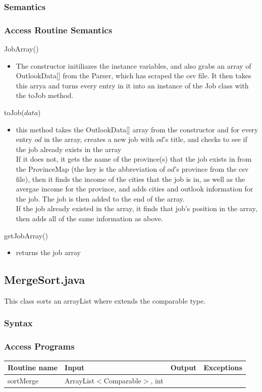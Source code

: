 \documentclass[12pt,fleqn]{article}
\begin{document}
\subsubsection*{Semantics}
\subsubsection*{Access Routine Semantics}
\noindent JobArray()
\begin{itemize}
\item The constructor initiliazes the instance variables, and also grabs an array of OutlookData[] from the Parser, which has scraped the csv file. It then takes this arrya and turns every entry in it into an instance of the Job class with the toJob method.
\end{itemize}
\noindent toJob($data$)
\begin{itemize}
\item this method takes the OutlookData[] array from the constructor and for every entry $od$ in the array, creates a new job with $od$'s title, and checks to see if the job already exists in the array
\\If it does not, it gets the name of the province(s) that the job exists in from the ProvinceMap (the key is the abbreviation of $od$'s province from the csv file), then it finds the income of the cities that the job is in, as well as the avergae income for the province, and adds cities and outlook information for the job. The job is then added to the end of the array.
\\If the job already existed in the array, it finds that job's position in the array, then adds all of the same information as above.
\end{itemize}
\noindent getJobArray()
\begin{itemize}
\item returns the job array
\end{itemize}


\subsection*{MergeSort.java}\label{sort}
This class sorts an arrayList where extends the comparable type.
\subsubsection* {Syntax}

\subsubsection* {Access Programs}
\begin{tabular}{| l | l | l | l |}
\hline
\textbf{Routine name} & \textbf{Input} & \textbf{Output} & \textbf{Exceptions}\\
\hline
sortMerge & ArrayList$<$Comparable$>$, int & ~ & ~\\
\hline
\end{tabular}
\end{document}
